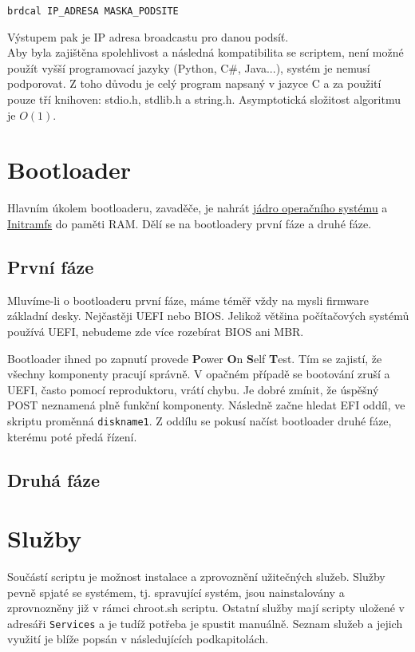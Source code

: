 \documentclass[12pt,a4paper,twoside,]{article}
\begin{document}
\texttt{brdcal IP\_ADRESA MASKA\_PODSITE}

\hspace*{-1.5em}Výstupem pak je IP adresa broadcastu pro danou podsíť. \\


Aby byla zajištěna spolehlivost a následná kompatibilita se scriptem, není možné použít vyšší programovací jazyky (Python, C\#, Java...), systém je nemusí podporovat. Z toho důvodu je celý program napsaný v jazyce C a za použití pouze tří knihoven: stdio.h, stdlib.h a string.h. Asymptotická složitost algoritmu je $O(1)$.

\newpage
\section{\textsf{Bootloader}}

Hlavním úkolem bootloaderu, zavaděče, je nahrát \hyperlink{Kernel}{jádro operačního systému} a \hyperlink{Initramfs}{Initramfs} do paměti RAM. Dělí se na bootloadery první fáze a druhé fáze.
\subsection{\textsf{První fáze}}
Mluvíme-li o bootloaderu první fáze, máme téměř vždy na mysli firmware základní desky. Nejčastěji UEFI nebo BIOS. Jelikož většina počítačových systémů používá UEFI, nebudeme zde více rozebírat BIOS ani MBR.

\hspace{-1.5em}Bootloader ihned po zapnutí provede {\bf P}ower {\bf O}n {\bf S}elf {\bf T}est. Tím se zajistí, že všechny komponenty pracují správně. V opačném případě se bootování zruší a UEFI, často pomocí reproduktoru, vrátí chybu. Je dobré zmínit, že úspěšný POST neznamená plně funkční komponenty. Následně začne hledat EFI oddíl, ve skriptu proměnná \texttt{diskname1}. Z oddílu se pokusí načíst bootloader druhé fáze, kterému poté předá řízení.

\subsection{\textsf{Druhá fáze}}
\newpage
\section{\textsf{Služby}}
Součástí scriptu je možnost instalace a zprovoznění užitečných služeb. Služby pevně spjaté se systémem, tj. spravující systém, jsou nainstalovány a zprovnozněny již v rámci chroot.sh scriptu. Ostatní služby mají scripty uložené v adresáři \texttt{Services} a je tudíž potřeba je spustit manuálně. Seznam služeb a jejich využití je blíže popsán v následujících podkapitolách. 
\end{document}
